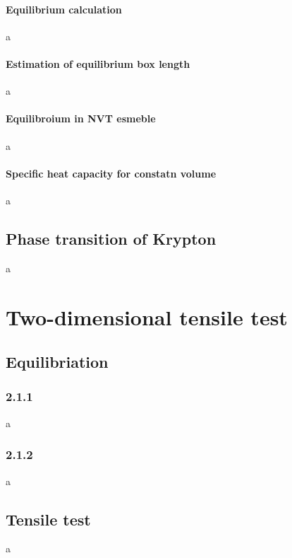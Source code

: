 \documentclass[10pt,a4paper]{report}
\begin{document}
\subsubsection{Equilibrium calculation}
a
\subsubsection{Estimation of equilibrium box length}
a
\subsubsection{Equilibroium in NVT esmeble}
a
\subsubsection{Specific heat capacity for constatn volume}
a

\section{Phase transition of Krypton}
a


\chapter{Two-dimensional tensile test}
\section{Equilibriation}
\subsection{2.1.1}
a
\subsection{2.1.2}
a

\section{Tensile test}
a
\end{document}
